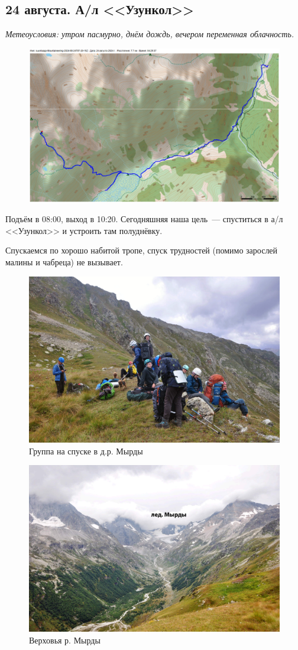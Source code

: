 \subsection{24 августа. А/л <<Узункол>>}
\textit{Метеоусловия: утром пасмурно, днём дождь, вечером переменная облачность.}


\begin{figure}[h!]
	\centering
	\includegraphics[angle=0, width=0.7\linewidth]{../pics/mini_maps/24}
	\label{fig:mini_24}
\end{figure}



Подъём в 08:00, выход в 10:20. Сегодняшняя наша цель~--- спуститься в а/л <<Узункол>> и устроить там полуднёвку.

Спускаемся по хорошо  набитой тропе, спуск трудностей (помимо зарослей малины и чабреца) не вызывает.
\begin{figure}[h!]
	\centering
	\includegraphics[width=0.7\linewidth]{../pics/DSC_0104.jpg}
	\caption{Группа на спуске в д.р. Мырды}
	\label{fig:DSC_0104.jpg}
\end{figure}

\begin{figure}[h!]
	\centering
	\includegraphics[width=0.7\linewidth]{../pics/DSC_0107.jpg}
	\caption{Верховья р. Мырды}
	\label{fig:DSC_0107.jpg}
\end{figure}

